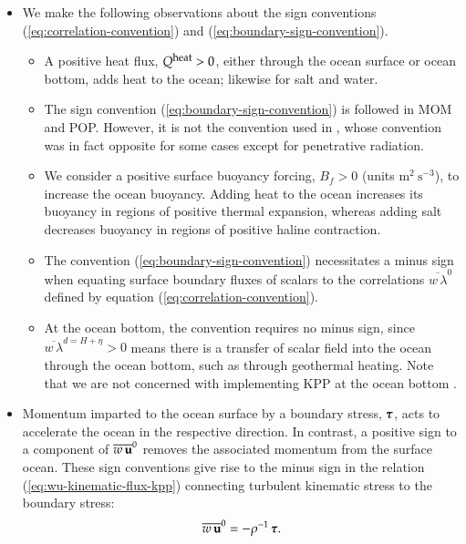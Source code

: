 \begin{itemize}
\item We make the following observations about the sign conventions
  (\ref{eq:correlation-convention}) and
  (\ref{eq:boundary-sign-convention}).
\begin{itemize}
\item A positive heat flux, $Q^{\mbox{\footnotesize heat}} > 0$,
  either through the ocean surface or ocean bottom, adds heat to the
  ocean; likewise for salt and water.

\item The sign convention (\ref{eq:boundary-sign-convention}) is
  followed in MOM and POP.  However, it is not the convention used in
  \cite{LargeKPP}, whose convention was in fact opposite for some
  cases except for penetrative radiation.

\item We consider a positive surface buoyancy forcing, $B_{f} > 0$
  (units $\mbox{m}^{2}~\mbox{s}^{-3}$), to increase the ocean
  buoyancy.  Adding heat to the ocean increases its buoyancy in
  regions of positive thermal expansion, whereas adding salt decreases
  buoyancy in regions of positive haline contraction.

\item The convention (\ref{eq:boundary-sign-convention}) necessitates
  a minus sign when equating surface boundary fluxes of scalars to the
  correlations $\overline{w \, \lambda}^{0}$ defined by equation
  (\ref{eq:correlation-convention}).

\item At the ocean bottom, the convention requires no minus sign,
  since $\overline{w \, \lambda}^{d=H+\eta} > 0$ means there is a transfer
  of scalar field into the ocean through the ocean bottom, such as
  through geothermal heating.  Note that we are not concerned with
  implementing KPP at the ocean bottom \citep{Durski_etal2004}.

\end{itemize}

\item Momentum imparted to the ocean surface by a boundary stress,
  $\mbox{\boldmath $\tau$}$, acts to accelerate the ocean in the respective direction.
  In contrast, a positive sign to a component of $\overline{w \, {\bf
      u}}^{0}$ removes the associated momentum from the surface
  ocean.  These sign conventions give rise to the minus sign in the
  relation (\ref{eq:wu-kinematic-flux-kpp}) connecting turbulent
  kinematic stress to the boundary stress: 
\begin{equation}
  \overline{w \, {\bf u}}^{0} = -\rho^{-1} \, \mbox{\boldmath $\tau$}.  
\end{equation}


\end{itemize}

